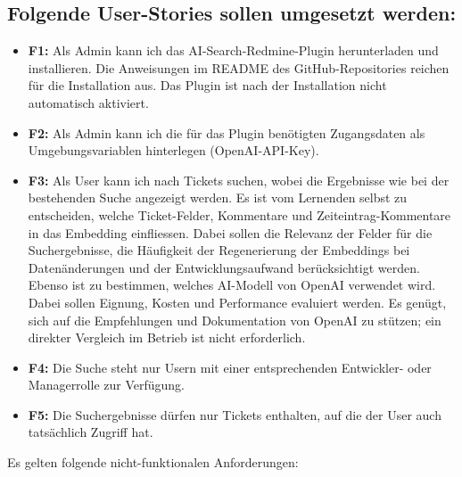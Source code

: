 \subsection{Folgende User-Stories sollen umgesetzt werden:}

\begin{itemize}
    \item \textbf{F1:} Als Admin kann ich das AI-Search-Redmine-Plugin herunterladen und installieren. Die Anweisungen im README des GitHub-Repositories reichen für die Installation aus. Das Plugin ist nach der Installation nicht automatisch aktiviert.
    \item \textbf{F2:} Als Admin kann ich die für das Plugin benötigten Zugangsdaten als Umgebungsvariablen hinterlegen (OpenAI-API-Key).
    \item \textbf{F3:} Als User kann ich nach Tickets suchen, wobei die Ergebnisse wie bei der bestehenden Suche angezeigt werden. Es ist vom Lernenden selbst zu entscheiden, welche Ticket-Felder, Kommentare und Zeiteintrag-Kommentare in das Embedding einfliessen. Dabei sollen die Relevanz der Felder für die Suchergebnisse, die Häufigkeit der Regenerierung der Embeddings bei Datenänderungen und der Entwicklungsaufwand berücksichtigt werden. Ebenso ist zu bestimmen, welches AI-Modell von OpenAI verwendet wird. Dabei sollen Eignung, Kosten und Performance evaluiert werden. Es genügt, sich auf die Empfehlungen und Dokumentation von OpenAI zu stützen; ein direkter Vergleich im Betrieb ist nicht erforderlich.
    \item \textbf{F4:} Die Suche steht nur Usern mit einer entsprechenden Entwickler- oder Managerrolle zur Verfügung.
    \item \textbf{F5:} Die Suchergebnisse dürfen nur Tickets enthalten, auf die der User auch tatsächlich Zugriff hat.
\end{itemize}

Es gelten folgende nicht-funktionalen Anforderungen:

